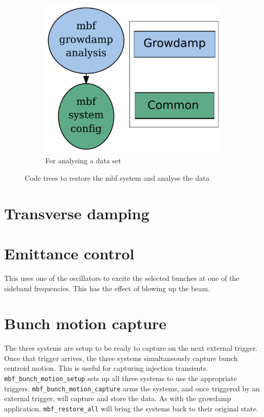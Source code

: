 \documentclass{report}
\begin{document}
\begin{figure}[hbt]
\begin{subfigure}[b]{0.3\textwidth}
        \includegraphics[width=\textwidth]{mbf_growdamp_analysis.pdf}
        \caption{For analysing a data set}
        \label{fig:growdamp_analysis}
    \end{subfigure}
    \caption{Code trees to restore the mbf system and analyse the data}\label{fig:growdamp_code_trees2}
\end{figure}
\chapter{Transverse damping}

\chapter{Emittance control}
This uses one of the oscillators to excite the selected bunches at one of the sideband frequencies. This has the effect of blowing up the beam.
\chapter{Bunch motion capture}
The three systems are setup to be ready to capture on the next external trigger. Once that trigger arrives, the three systems simultaneously capture bunch centroid motion. This is useful for capturing injection transients. \verb|mbf_bunch_motion_setup| sets up all three systems to use the appropriate triggers. \verb|mbf_bunch_motion_capture| arms the systems, and once triggered by an external trigger, will capture and store the data. As with the growdamp application, \verb|mbf_restore_all| will bring the systems back to their original state.
\end{document}
